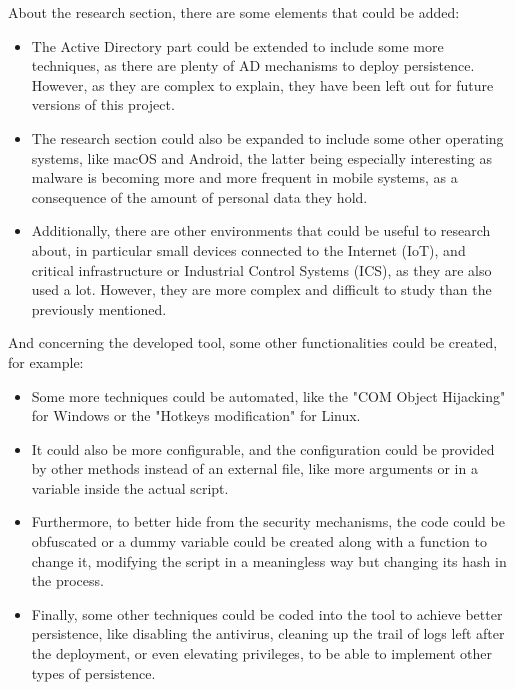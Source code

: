 About the research section, there are some elements that could be added:
\begin{itemize}
\item The Active Directory part could be extended to include some more techniques, as there are plenty of AD mechanisms to deploy persistence. However, as they are complex to explain, they have been left out for future versions of this project.
\item The research section could also be expanded to include some other operating systems, like macOS and Android, the latter being especially interesting as malware is becoming more and more frequent in mobile systems, as a consequence of the amount of personal data they hold.
\item Additionally, there are other environments that could be useful to research about, in particular small devices connected to the Internet (IoT), and critical infrastructure or Industrial Control Systems (ICS), as they are also used a lot. However, they are more complex and difficult to study than the previously mentioned.
\end{itemize}

And concerning the developed tool, some other functionalities could be created, for example:  
\begin{itemize}
\item Some more techniques could be automated, like the "COM Object Hijacking" for Windows or the "Hotkeys modification" for Linux.
\item It could also be more configurable, and the configuration could be provided by other methods instead of an external file, like more arguments or in a variable inside the actual script.
\item Furthermore, to better hide from the security mechanisms, the code could be obfuscated or a dummy variable could be created along with a function to change it, modifying the script in a meaningless way but changing its hash in the process.
\item Finally, some other techniques could be coded into the tool to achieve better persistence, like disabling the antivirus, cleaning up the trail of logs left after the deployment, or even elevating privileges, to be able to implement other types of persistence. 
\end{itemize}


